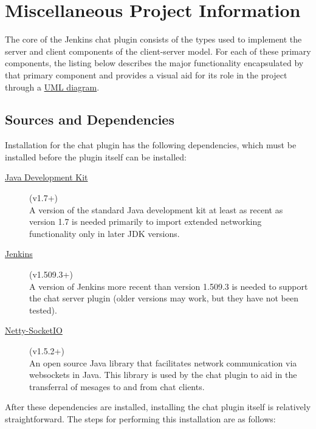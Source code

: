 \documentclass{article}
\begin{document}
	\section[Appendix]{Miscellaneous Project Information}
	The core of the Jenkins chat plugin consists of the types used to
	implement the server and client components of the client-server model.
	For each of these primary components, the listing below describes the
	major functionality encapsulated by that primary component and provides
	a visual aid for its role in the project through a 
	\href{http://www.csci.csusb.edu/dick/samples/uml0.html}{UML diagram}.

		\subsection[Dependencies]{Sources and Dependencies}
		Installation for the chat plugin has the following dependencies, which
		must be installed before the plugin itself can be installed:

		\begin{description}
			\item[\href{http://www.oracle.com/technetwork/java/javase/downloads/jdk7-downloads-1880260.html}{Java Development Kit}] (v1.7+) \hfill \\
			A version of the standard Java development kit at least as recent 
			as version 1.7 is needed primarily to import extended networking 
			functionality only in later JDK versions.

			\item[\href{http://jenkins-ci.org/}{Jenkins}] (v1.509.3+) \hfill \\
			A version of Jenkins more recent than version 1.509.3 is needed
			to support the chat server plugin (older versions may work, but they
			have not been tested).

			\item[\href{https://github.com/mrniko/netty-socketio/releases}{Netty-SocketIO}] (v1.5.2+) \hfill \\ 
			An open source Java library that facilitates network communication 
			via websockets in Java.  This library is used by the chat plugin
			to aid in the transferral of mesages to and from chat clients.
		\end{description}

		After these dependencies are installed, installing the chat plugin itself
		is relatively straightforward.  The steps for performing this installation
		are as follows:
\end{document}
